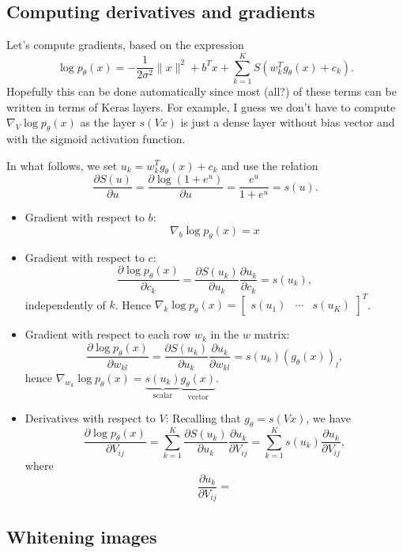 \documentclass[a4paper]{article}
\begin{document}
\newpage
\subsection*{Computing derivatives and gradients}
Let's compute gradients, based on the expression
$$\log p_\theta(x) =  -\frac{1}{2\sigma^2} \|x\|^2 + b^T x + \sum_{k=1}^K S(w_k^T g_\theta(x) + c_k).$$
Hopefully this can be done automatically since most (all?) of these terms can be written in terms of Keras layers. For example, I guess we don't have to compute $\nabla_V \log p_\theta(x)$ as the layer $s(Vx)$ is just a dense layer without bias vector and with the sigmoid activation function.

In what follows, we set $u_k = w_k^T  g_\theta(x) + c_k$ and use the relation
$$\frac{\partial S(u)}{\partial u} = \frac{\partial \log(1 + e^u)}{\partial u} = \frac{e^u}{1 + e^u} = s(u).$$
\begin{itemize}
\item Gradient with respect to $b$:
$$\nabla_b \log p_\theta(x) = x$$

\item Gradient with respect to $c$:
$$\frac{\partial \log p_\theta(x)}{\partial c_k} = \frac{\partial S(u_k)}{\partial u_k} \frac{\partial u_k}{\partial c_k} = s(u_k),$$
independently of $k$. Hence $\nabla_k \log p_\theta(x) = \begin{bmatrix}s(u_1) &\cdots &s(u_K)\end{bmatrix}^T$.

\item Gradient with respect to each row $w_k$ in the $w$ matrix:
$$\frac{\partial \log p_\theta(x)}{\partial w_{kl}} = \frac{\partial S(u_k)}{\partial u_k} \frac{\partial u_k}{\partial w_{kl}} = s(u_k) (g_\theta(x))_l,$$
hence $\nabla_{w_k} \log p_\theta(x) = \underbrace{s(u_k)}_{\text{scalar}} \underbrace{g_\theta(x)}_{\text{vector}}$. 

\item Derivatives with respect to $V$: Recalling that $g_\theta = s(Vx)$, we have
$$\frac{\partial \log p_\theta(x)}{\partial V_{ij}} = \sum_{k=1}^K \frac{\partial S(u_k)}{\partial u_k}\frac{\partial u_k}{\partial V_{ij}} = \sum_{k=1}^K s(u_k) \frac{\partial u_k}{\partial V_{ij}},$$
where
$$\frac{\partial u_k}{\partial V_{ij}} = $$

\end{itemize}

\newpage
\subsection*{Whitening images}
\end{document}
